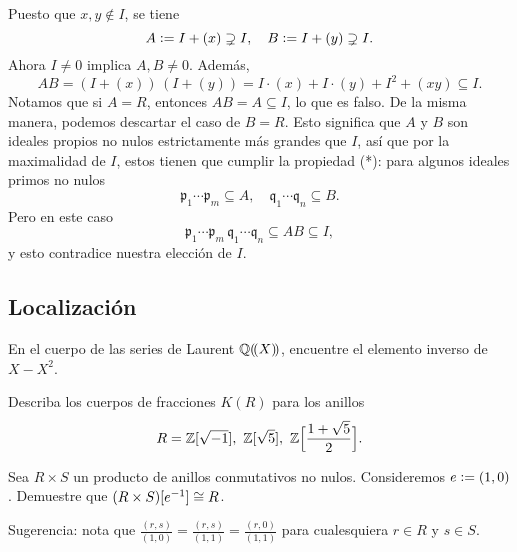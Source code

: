 \begin{ejercicio}
\begin{solucion}
    Puesto que $x,y\notin I$, se tiene
    $$A \mathrel{\mathop:}= I + (x) \supsetneq I, \quad B \mathrel{\mathop:}= I + (y) \supsetneq I.$$
    Ahora $I \ne 0$ implica $A,B\ne 0$. Además,
    \[ AB = (I + (x))\,(I + (y)) =
       I\cdot (x) + I\cdot (y) + I^2 + (xy) \subseteq I. \]
     Notamos que si $A = R$, entonces $AB = A \subseteq I$, lo que es falso.
     De la misma manera, podemos descartar el caso de $B = R$. Esto significa
     que $A$ y $B$ son ideales propios no nulos estrictamente más grandes que
     $I$, así que por la maximalidad de $I$, estos tienen que cumplir la
     propiedad (*): para algunos ideales primos no nulos
     \[ \mathfrak{p}_1\cdots \mathfrak{p}_m \subseteq A, \quad
        \mathfrak{q}_1\cdots \mathfrak{q}_n \subseteq B. \]
     Pero en este caso
     $$\mathfrak{p}_1\cdots \mathfrak{p}_m\,\mathfrak{q}_1\cdots\mathfrak{q}_n \subseteq AB \subseteq I,$$
     y esto contradice nuestra elección de $I$.
   \end{solucion}
   \fi
\end{ejercicio}

\subsection*{Localización}

\begin{ejercicio}
  En el cuerpo de las series de Laurent $\mathbb{Q} (\!(X)\!)$, encuentre el elemento
  inverso de $X - X^2$.
\end{ejercicio}

\begin{ejercicio}
  Describa los cuerpos de fracciones $K (R)$ para los anillos
  \[ R = \mathbb{Z} [\sqrt{-1}], ~
         \mathbb{Z} [\sqrt{5}], ~
         \mathbb{Z} \Bigl[\frac{1 + \sqrt{5}}{2}\Bigr]. \]
\end{ejercicio}

\begin{ejercicio}
  Sea $R\times S$ un producto de anillos conmutativos no nulos. Consideremos
  $e \mathrel{\mathop:}= (1,0)$. Demuestre que $(R\times S) [e^{-1}] \cong R$.

  \noindent Sugerencia: nota que
  $\frac{(r,s)}{(1,0)} = \frac{(r,s)}{(1,1)} = \frac{(r,0)}{(1,1)}$ para
  cualesquiera $r\in R$ y $s\in S$.
\end{ejercicio}

